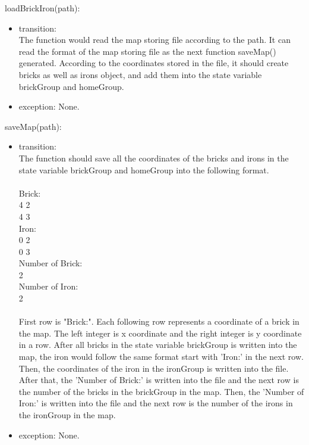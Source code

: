 \documentclass[12pt, titlepage]{article}
\begin{document}
        loadBrickIron(path):
		\begin{itemize}
		\item transition: \\
		The function would read the map storing file according to the path. It can read the format of the map storing file as the next function saveMap() generated. According to the coordinates stored in the file, it should create bricks as well as irons object, and add them into the state variable brickGroup and homeGroup.
		
		\item exception: None.
        \end{itemize}
        
        saveMap(path):
		\begin{itemize}
		\item transition: \\
		The function should save all the coordinates of the bricks and irons in the state variable brickGroup and homeGroup into the following format.\\
		\\
		Brick:\\
		4 2\\
		4 3\\
		Iron:\\
		0 2\\
		0 3\\
		Number of Brick:\\
		2\\
		Number of Iron:\\
		2\\
		\\
		First row is "Brick:". Each following row represents a coordinate of a brick in the map. The left integer is x coordinate and the right integer is y coordinate in a row. After all bricks in the state variable brickGroup is written into the map, the iron would follow the same format start with 'Iron:' in the next row. Then, the coordinates of the iron in the ironGroup is written into the file. After that, the 'Number of Brick:' is written into the file and the next row is the number of the bricks in the brickGroup in the map. Then, the 'Number of Iron:' is written into the file and the next row is the number of the irons in the ironGroup in the map.
		\item exception: None.
        \end{itemize}
        
\end{document}
